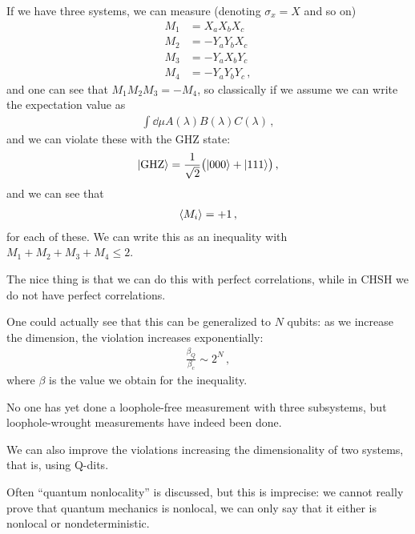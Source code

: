 \documentclass[main.tex]{subfiles}
\begin{document}
If we have three systems, we can measure (denoting \(\sigma_{x} = X\) and so on)
%
\begin{align}
M_1 &= X_{a} X_{b} X_{c} \\
M_2 &= - Y_{a} Y_{b} X_{c} \\
M_3 &= - Y_{a} X_{b} Y_{c} \\
M_4 &= - Y_{a} Y_{b} Y_{c}
\,,
\end{align}
%
and one can see that \(M_1 M_2 M_3 = - M_4 \), so classically if we assume we can write the expectation value as 
%
\begin{align}
\int \dd{\mu } A(\lambda ) B(\lambda ) C(\lambda )
\,,
\end{align}
%
and we can violate these with the GHZ state: 
%
\begin{align}
\ket{\text{GHZ}} = \frac{1}{\sqrt{2}} \qty(\ket{000} + \ket{111})
\,,
\end{align}
%
and we can see that 
%
\begin{align}
\expval{M_i} = +1
\,,
\end{align}
%
for each of these. We can write this as an inequality with \(M_1 + M_2 + M_3 + M_4 \leq 2\). 

The nice thing is that we can do this with perfect correlations, while in CHSH we do not have perfect correlations. 

One could actually see that this can be generalized to \(N\) qubits: as we increase the dimension, the violation increases exponentially: 
%
\begin{align}
\frac{\beta_{Q}}{\beta_{c}} \sim 2^{N}
\,,
\end{align}
%
where \(\beta \) is the value we obtain for the inequality. 

No one has yet done a loophole-free measurement with three subsystems, but loophole-wrought measurements have indeed been done. 

We can also improve the violations increasing the dimensionality of two systems, that is, using Q-dits.

Often ``quantum nonlocality'' is discussed, but this is imprecise: we cannot really prove that quantum mechanics is nonlocal, we can only say that it either is  nonlocal or nondeterministic. 
\end{document}
